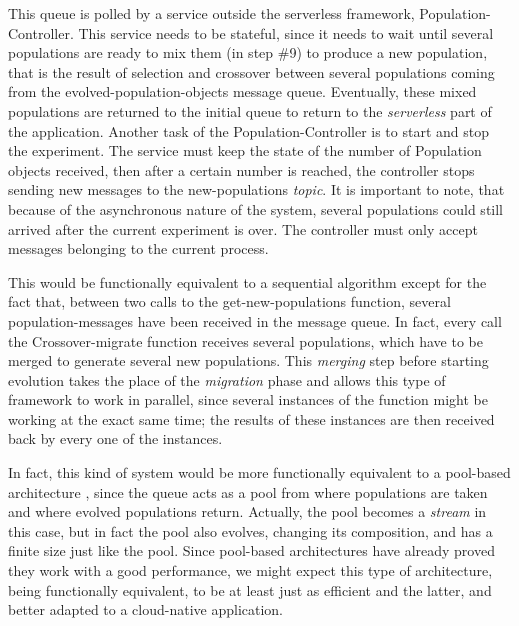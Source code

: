 \documentclass[sigconf]{acmart}
\begin{document}
This queue is polled by a service outside the serverless framework,
{\sf Population-Controller}. This service needs to be stateful, since
it needs to wait until several populations are ready to mix them (in
step \#9) to produce a new population, that is the result of selection
and crossover between several populations coming from the {\sf
  evolved-population-objects} message queue. Eventually, these mixed
populations are returned to the initial queue to return to the {\em
  serverless} part of the application. Another task of the {\sf Population-Controller} is to start and stop the experiment. The service must 
  keep the state of the number of Population objects received, then after 
  a certain number is reached, the controller stops sending new messages to the 
  {\sf new-populations} {\em topic}. It is important to note, that because of
  the asynchronous nature of the system, several populations could still 
  arrived after the current experiment is over. The controller must only 
  accept messages belonging to the current process.   
  

This would be functionally equivalent to a sequential algorithm except
for the fact that, between two calls to the {\sf get-new-populations}
function, several 
population-messages have been received in the message queue. In fact,
every call the {\sf Crossover-migrate} function receives several populations, which
have to be merged to generate several new populations. This {\em merging} step
before starting evolution takes the place of the {\em migration} phase
and allows this type of framework to work in parallel, since several
instances of the function might be working at the exact same time; the
results of these instances are then received back by every one of the
instances.

In fact, this kind of system would be more functionally equivalent to
a pool-based architecture \cite{bollini1999distributed}, since the
queue acts as a pool from where populations are taken and where
evolved populations return. Actually, the pool becomes a {\em stream}
in this case, but in fact the pool also evolves, changing its
composition, and has a finite size just like the pool. Since
pool-based architectures have already proved they work with a good
performance, we might expect this type of architecture, being
functionally equivalent, to be at least just as efficient and the
latter, and better adapted to a cloud-native application.
\end{document}
